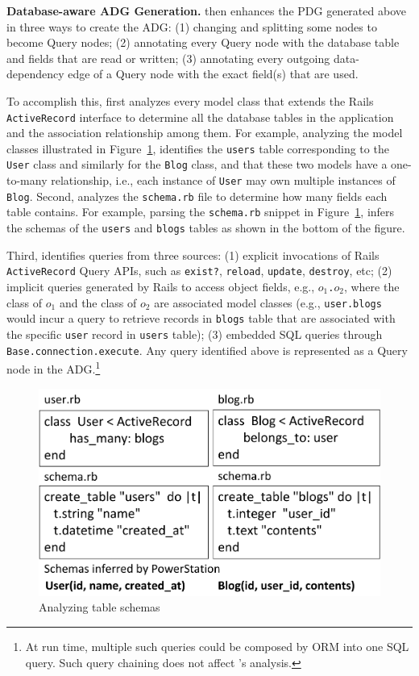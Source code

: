 \textbf{Database-aware ADG Generation.}
\Tool then enhances the PDG generated above in three ways to create the ADG: 
(1) changing and splitting some nodes to become 
Query nodes; (2) annotating every Query node with the database table and fields that are read or written; 
(3) annotating every outgoing data-dependency edge of a Query node with the exact field(s) that are used.

To accomplish this, \Tool first analyzes every model class that extends the Rails
{\tt ActiveRecord} interface to determine all the database
tables in the application and the association relationship among them.
For example, analyzing the model classes illustrated in 
Figure~\ref{fig:schema}, \Tool identifies the {\tt users} table
corresponding to the {\tt User} class and similarly for the {\tt Blog} class, and that these two models have 
a one-to-many relationship, i.e., each instance of {\tt User} may own multiple instances of {\tt Blog}.
Second, \Tool analyzes the {\tt schema.rb} file to determine
how many fields each table contains. For example, parsing the
{\tt schema.rb} snippet in Figure~\ref{fig:schema}, \Tool infers the schemas of the {\tt users} and {\tt blogs} tables as
shown in the bottom of the figure.

Third, \Tool identifies queries from three sources: (1) explicit 
invocations of
Rails {\tt ActiveRecord} Query APIs, such as {\tt exist?},
{\tt reload}, {\tt update}, {\tt destroy}, etc;
(2) implicit queries generated by Rails to access object fields, e.g., {\tt $o_1$.$o_2$}, where 
the class of $o_1$ and the class of $o_2$ are associated model classes
(e.g., {\tt user.blogs} would incur a query to
retrieve records in {\tt blogs} table that are associated with
the specific {\tt user} record in {\tt users} table);
(3) embedded SQL queries through {\tt Base.connection.execute}.
Any query identified above is represented as a Query node in the ADG.\footnote{At run time,
multiple such queries could be composed by ORM into one SQL query.
Such query chaining does not affect \Tool's analysis.} 


\begin{figure}
    \centering
    \includegraphics[width=0.7\columnwidth]{figs/schema.pdf}
    \caption{Analyzing table schemas}
    \label{fig:schema}
\end{figure}


